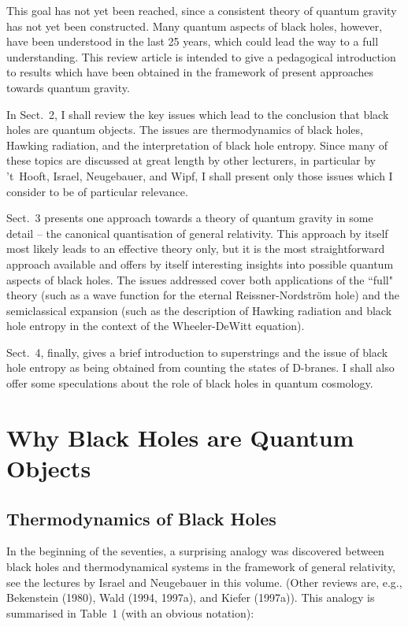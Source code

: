This goal has not yet been reached, since a consistent theory of
quantum gravity has not yet been constructed.
Many quantum aspects of black holes, however, have been
understood in the last 25 years, which could lead the way to a
full understanding. This review article is intended to give
a pedagogical introduction to results which have been obtained
in the framework of present approaches towards quantum gravity.

In Sect.~2, I shall review the key issues which lead to
the conclusion that black holes are quantum objects. The issues are
thermodynamics of black holes, Hawking radiation, and the
interpretation of black hole entropy. Since many of these topics
are discussed at great length by other lecturers, in particular by
't~Hooft, Israel, Neugebauer, and Wipf, I shall present only   
those issues which I consider to be of particular relevance.

Sect.~3 presents one approach towards a theory of quantum
gravity in some detail -- the canonical quantisation of general relativity.
This approach by itself most likely leads to
an effective theory only, but it is
the most straightforward approach available and offers by itself
interesting insights into possible quantum aspects of black holes.
The issues addressed cover both applications of the ``full"
theory (such as a wave function for the eternal Reissner-Nordstr\"om hole)
and the semiclassical expansion
(such as the description of Hawking radiation and black hole entropy in
the context of the Wheeler-DeWitt equation).

Sect.~4, finally, gives a brief introduction to superstrings and the
issue of black hole entropy as being obtained from counting
the states of D-branes. I shall also offer some speculations
about the role of black holes in quantum cosmology. 
  
\section{Why Black Holes are Quantum Objects}

\subsection{Thermodynamics of Black Holes}
In the beginning of the seventies, a surprising analogy
was discovered between black holes and thermodynamical systems
in the framework of general relativity,
see the lectures by Israel and Neugebauer in this volume.
(Other reviews are, e.g., Bekenstein (1980), Wald (1994, 1997a),
and Kiefer (1997a)). This analogy is summarised in
Table~1 (with an obvious notation):

